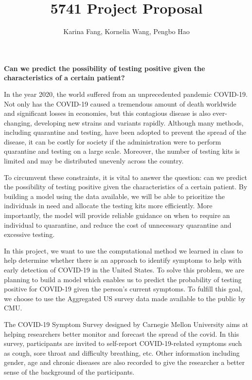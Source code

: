 \documentclass{article}
\title{5741 Project Proposal}
\author{Karina Fang, Kornelia Wang, Pengbo Hao}
\begin{document}
\maketitle
\textbf{Can we predict the possibility of testing positive given the characteristics of a certain patient?} 
\vspace{12pt} %

In the year 2020, the world suffered from an unprecedented pandemic COVID-19. Not only has the COVID-19 caused a tremendous amount of death worldwide and significant losses in economies, but this contagious disease is also ever-changing, developing new strains and variants rapidly. Although many methods, including quarantine and testing, have been adopted to prevent the spread of the disease, it can be costly for society if the administration were to perform quarantine and testing on a large scale. Moreover, the number of testing kits is limited and may be distributed unevenly across the country. 
\vspace{12pt} %

To circumvent these constraints, it is vital to answer the question: can we predict the possibility of testing positive given the characteristics of a certain patient. By building a model using the data available, we will be able to prioritize the individuals in need and allocate the testing kits more efficiently. More importantly, the model will provide reliable guidance on when to require an individual to quarantine, and reduce the cost of unnecessary quarantine and excessive testing.
\vspace{12pt} %

In this project, we want to use the computational method we learned in class to help determine whether there is an approach to identify symptoms to help with early detection of COVID-19 in the United States. To solve this problem, we are planning to build a model which enables us to predict the probability of testing positive for COVID-19 given the person’s current symptoms. To fulfill this goal, we choose to use the Aggregated US survey data made available to the public by CMU.
\vspace{12pt} %

The COVID-19 Symptom Survey designed by Carnegie Mellon University aims at helping researchers better monitor and forecast the spread of the covid. In this survey, participants are invited to self-report COVID-19-related symptoms such as cough, sore throat and difficulty breathing, etc. Other information including gender, age and chronic diseases are also recorded to give the researcher a better sense of the background of the participants.
\vspace{12pt} %
 
\end{document}
